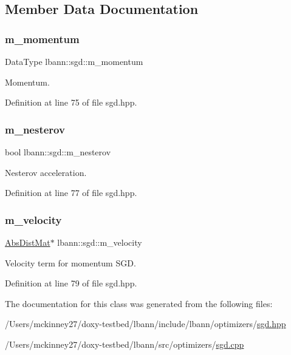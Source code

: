 \subsection{Member Data Documentation}
\mbox{\label{classlbann_1_1sgd_a2e56d66d350debcf0d2c3ad76c214074}} 
\subsubsection{\texorpdfstring{m\+\_\+momentum}{m\_momentum}}
{\footnotesize\ttfamily Data\+Type lbann\+::sgd\+::m\+\_\+momentum\hspace{0.3cm}{\ttfamily [private]}}

Momentum. 

Definition at line 75 of file sgd.\+hpp.

\mbox{\label{classlbann_1_1sgd_a82da488e5d1530f50f67cd4ea30909cb}} 
\subsubsection{\texorpdfstring{m\+\_\+nesterov}{m\_nesterov}}
{\footnotesize\ttfamily bool lbann\+::sgd\+::m\+\_\+nesterov\hspace{0.3cm}{\ttfamily [private]}}

Nesterov acceleration. 

Definition at line 77 of file sgd.\+hpp.

\mbox{\label{classlbann_1_1sgd_a27f2d893014cef8357edffb63bf649f0}} 
\subsubsection{\texorpdfstring{m\+\_\+velocity}{m\_velocity}}
{\footnotesize\ttfamily \hyperlink{base_8hpp_a9a697a504ae84010e7439ffec862b470}{Abs\+Dist\+Mat}$\ast$ lbann\+::sgd\+::m\+\_\+velocity\hspace{0.3cm}{\ttfamily [private]}}

Velocity term for momentum S\+GD. 

Definition at line 79 of file sgd.\+hpp.



The documentation for this class was generated from the following files\+:\begin{DoxyCompactItemize}
\item 
/\+Users/mckinney27/doxy-\/testbed/lbann/include/lbann/optimizers/\hyperlink{sgd_8hpp}{sgd.\+hpp}\item 
/\+Users/mckinney27/doxy-\/testbed/lbann/src/optimizers/\hyperlink{sgd_8cpp}{sgd.\+cpp}\end{DoxyCompactItemize}
